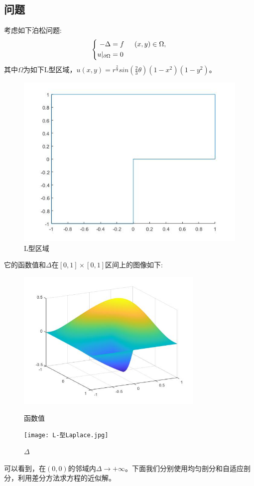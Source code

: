 \documentclass[12pt]{ctexart}
\begin{document}
\subsection{问题}
考虑如下泊松问题:
$$
\left\{\begin{aligned}
-\Delta&=f\indent (x,y)\in \Omega,\\
u|_{\partial\Omega}&=0
\end{aligned}
\right.
$$
\noindent 其中$\Omega$为如下L型区域，$u(x,y)=r^{\frac{2}{3}}sin(\frac{2}{3}\theta)(1-x^2)(1-y^2)$。\\
\begin{figure}[H]
	\centering
	\includegraphics[width=12cm]{L-shaped.jpg}
	\caption{L型区域}
\end{figure}
\noindent 它的函数值和$\Delta$在$[0,1]\times[0,1]$区间上的图像如下:\\
\begin{figure}[H]
	\centering
	\begin{minipage}[t]{0.48\textwidth}
		\centering
		\includegraphics[width=9cm]{L-型函数.jpg}
		\caption{函数值}
	\end{minipage}
	\begin{minipage}[t]{0.48\textwidth}
		\centering
		\texttt{[image: L-型Laplace.jpg]}
		\caption{$\Delta$}
	\end{minipage}
\end{figure}
\noindent 可以看到，在$(0,0)$的邻域内$\Delta\to +\infty$。下面我们分别使用均匀剖分和自适应剖分，利用差分方法求方程的近似解。
\end{document}
